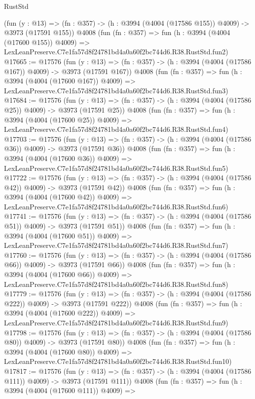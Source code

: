 \begin{lexlean}{RustStd}
\begin{coremodule}
    (fun (y : @13) => (fn : @357) -> (h : @3994 (@4004 (@17586 @155)) @4009) -> @3973 (@17591 @155))
    @4008
    (fun (fn : @357) =>
    fun (h : @3994 (@4004 (@17600 @155)) @4009) =>
    LexLeanPreserve.C7e1fa57d8f24781bd4a0a60f2bc744d6.R38.RustStd.fun2)
@17665 := @17576
    (fun (y : @13) => (fn : @357) -> (h : @3994 (@4004 (@17586 @167)) @4009) -> @3973 (@17591 @167))
    @4008
    (fun (fn : @357) =>
    fun (h : @3994 (@4004 (@17600 @167)) @4009) =>
    LexLeanPreserve.C7e1fa57d8f24781bd4a0a60f2bc744d6.R38.RustStd.fun3)
@17684 := @17576
    (fun (y : @13) => (fn : @357) -> (h : @3994 (@4004 (@17586 @25)) @4009) -> @3973 (@17591 @25))
    @4008
    (fun (fn : @357) =>
    fun (h : @3994 (@4004 (@17600 @25)) @4009) =>
    LexLeanPreserve.C7e1fa57d8f24781bd4a0a60f2bc744d6.R38.RustStd.fun4)
@17703 := @17576
    (fun (y : @13) => (fn : @357) -> (h : @3994 (@4004 (@17586 @36)) @4009) -> @3973 (@17591 @36))
    @4008
    (fun (fn : @357) =>
    fun (h : @3994 (@4004 (@17600 @36)) @4009) =>
    LexLeanPreserve.C7e1fa57d8f24781bd4a0a60f2bc744d6.R38.RustStd.fun5)
@17722 := @17576
    (fun (y : @13) => (fn : @357) -> (h : @3994 (@4004 (@17586 @42)) @4009) -> @3973 (@17591 @42))
    @4008
    (fun (fn : @357) =>
    fun (h : @3994 (@4004 (@17600 @42)) @4009) =>
    LexLeanPreserve.C7e1fa57d8f24781bd4a0a60f2bc744d6.R38.RustStd.fun6)
@17741 := @17576
    (fun (y : @13) => (fn : @357) -> (h : @3994 (@4004 (@17586 @51)) @4009) -> @3973 (@17591 @51))
    @4008
    (fun (fn : @357) =>
    fun (h : @3994 (@4004 (@17600 @51)) @4009) =>
    LexLeanPreserve.C7e1fa57d8f24781bd4a0a60f2bc744d6.R38.RustStd.fun7)
@17760 := @17576
    (fun (y : @13) => (fn : @357) -> (h : @3994 (@4004 (@17586 @66)) @4009) -> @3973 (@17591 @66))
    @4008
    (fun (fn : @357) =>
    fun (h : @3994 (@4004 (@17600 @66)) @4009) =>
    LexLeanPreserve.C7e1fa57d8f24781bd4a0a60f2bc744d6.R38.RustStd.fun8)
@17779 := @17576
    (fun (y : @13) => (fn : @357) -> (h : @3994 (@4004 (@17586 @222)) @4009) -> @3973 (@17591 @222))
    @4008
    (fun (fn : @357) =>
    fun (h : @3994 (@4004 (@17600 @222)) @4009) =>
    LexLeanPreserve.C7e1fa57d8f24781bd4a0a60f2bc744d6.R38.RustStd.fun9)
@17798 := @17576
    (fun (y : @13) => (fn : @357) -> (h : @3994 (@4004 (@17586 @80)) @4009) -> @3973 (@17591 @80))
    @4008
    (fun (fn : @357) =>
    fun (h : @3994 (@4004 (@17600 @80)) @4009) =>
    LexLeanPreserve.C7e1fa57d8f24781bd4a0a60f2bc744d6.R38.RustStd.fun10)
@17817 := @17576
    (fun (y : @13) => (fn : @357) -> (h : @3994 (@4004 (@17586 @111)) @4009) -> @3973 (@17591 @111))
    @4008
    (fun (fn : @357) =>
    fun (h : @3994 (@4004 (@17600 @111)) @4009) =>

\end{coremodule}
\end{lexlean}
